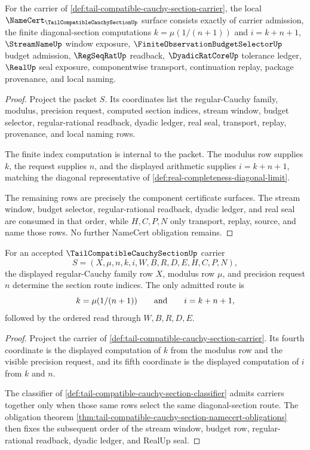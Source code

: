 \begin{theorem}
\label{thm:tail-compatible-cauchy-section-namecert-obligations}
For the carrier of \autoref{def:tail-compatible-cauchy-section-carrier}, the local $\NameCert_{\TailCompatibleCauchySectionUp}$ surface consists exactly of carrier admission, the finite diagonal-section computations $k=\mu(1/(n+1))$ and $i=k+n+1$, $\StreamNameUp$ window exposure, $\FiniteObservationBudgetSelectorUp$ budget admission, $\RegSeqRatUp$ readback, $\DyadicRatCoreUp$ tolerance ledger, $\RealUp$ seal exposure, componentwise transport, continuation replay, package provenance, and local naming.
\end{theorem}
\begin{proof}
Project the packet $S$. Its coordinates list the regular-Cauchy family, modulus, precision request, computed section indices, stream window, budget selector, regular-rational readback, dyadic ledger, real seal, transport, replay, provenance, and local naming rows.

The finite index computation is internal to the packet. The modulus row supplies $k$, the request supplies $n$, and the displayed arithmetic supplies $i=k+n+1$, matching the diagonal representative of \autoref{def:real-completeness-diagonal-limit}.

The remaining rows are precisely the component certificate surfaces. The stream window, budget selector, regular-rational readback, dyadic ledger, and real seal are consumed in that order, while $H,C,P,N$ only transport, replay, source, and name those rows. No further NameCert obligation remains.
\end{proof}

\begin{theorem}
\label{thm:tail-compatible-cauchy-section-index-determinacy}
For an accepted $\TailCompatibleCauchySectionUp$ carrier
$$
S=(X,\mu,n,k,i,W,B,R,D,E,H,C,P,N),
$$
the displayed regular-Cauchy family row $X$, modulus row $\mu$, and precision request $n$ determine the section route indices. The only admitted route is
$$
k=\mu(1/(n+1))
\qquad\hbox{and}\qquad
i=k+n+1,
$$
followed by the ordered read through $W,B,R,D,E$.
\end{theorem}
\begin{proof}
Project the carrier of \autoref{def:tail-compatible-cauchy-section-carrier}. Its fourth coordinate is the displayed computation of $k$ from the modulus row and the visible precision request, and its fifth coordinate is the displayed computation of $i$ from $k$ and $n$.

The classifier of \autoref{def:tail-compatible-cauchy-section-classifier} admits carriers together only when those same rows select the same diagonal-section route. The obligation theorem \autoref{thm:tail-compatible-cauchy-section-namecert-obligations} then fixes the subsequent order of the stream window, budget row, regular-rational readback, dyadic ledger, and RealUp seal.
\end{proof}

